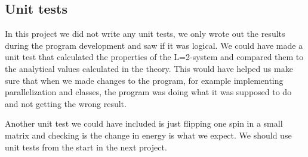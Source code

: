 
\subsection{Unit tests}

In this project we did not write any unit tests, we only wrote out the results during the program development and saw if it was logical. We could have made a unit test that calculated the properties of the L=2-system and compared them to the analytical values calculated in the theory. This would have helped us make sure that when we made changes to the program, for example implementing parallelization and classes, the program was doing what it was supposed to do and not getting the wrong result. 

Another unit test we could have included is just flipping one spin in a small matrix and checking is the change in energy is what we expect. We should use unit tests from the start in the next project.
	
